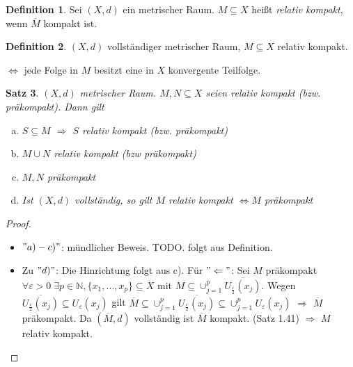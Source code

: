 \documentclass[ngerman]{report}
\theoremstyle{plain}%
\newtheorem{thm}{Satz}[chapter]
\theoremstyle{definition}%
\newtheorem{definition}[thm]{Definition}
\theoremstyle{myStyle}
\newcommand{\N}{\mathbb{N}}
\newcommand{\df}[1][]{%
	\overset{#1}{\Rightarrow}
}
\newcommand{\qmarks}[1]{"#1"}
\begin{document}
	\begin{definition}
		Sei $(X,d)$ ein metrischer Raum. $M\subseteq X$ heißt \textit{relativ kompakt}, wenn $\overline{M}$ kompakt ist.
	\end{definition}

	\begin{definition}
		$(X,d)$ vollständiger metrischer Raum, $M \subseteq X$ relativ kompakt. \par
{}
			$\Leftrightarrow$ jede Folge in $M$ besitzt eine in $X$ konvergente Teilfolge.
	\end{definition}

	\begin{thm}
		$(X,d)$ metrischer Raum. $M,N \subseteq X$ seien relativ kompakt (bzw. präkompakt). Dann gilt 
			\begin{enumerate}[a)]
				\item $S\subseteq M$ $\df$ $S$ relativ kompakt (bzw. präkompakt)
				\item $M\cup N$ relativ kompakt (bzw präkompakt)
				\item $M,N$ präkompakt
				\item Ist $(X,d)$ vollständig, so gilt $M$ relativ kompakt $\Leftrightarrow M$ präkompakt
			\end{enumerate}
	\end{thm}

	\begin{proof}
		\begin{itemize}[]
			\item $\qmarks{a) - c)}$: mündlicher Beweis. TODO. folgt aus Definition.
			\item Zu $\qmarks{d)}$: Die Hinrichtung folgt aus c). 
				Für $"{}\Leftarrow"$: Sei $M$ präkompakt $\forall \varepsilon > 0\; \exists p\in\N, \{x_1,\dots,x_p\} \subseteq X$ mit $M \subseteq \cup_{j=1}^p \overline{ U_{\frac{\varepsilon}{2}}(x_j)}$. 
				Wegen $\overline{U_{\frac{\varepsilon}{2}}(x_j)} \subseteq U_{{\varepsilon}}(x_j)$ gilt
				$\overline{M} \subseteq \cup_{j=1}^p \overline{U_{\frac{\varepsilon}{2}}(x_j)} \subseteq \cup_{j=1}^p U_{\varepsilon}(x_j)$
				$\df$ $\overline{M}$ präkompakt. Da $(\overline{M},d)$ vollständig ist $\overline{M}$ kompakt. (Satz 1.41) $\df$ $M$ relativ kompakt.
		\end{itemize}
	\end{proof}
\end{document}
